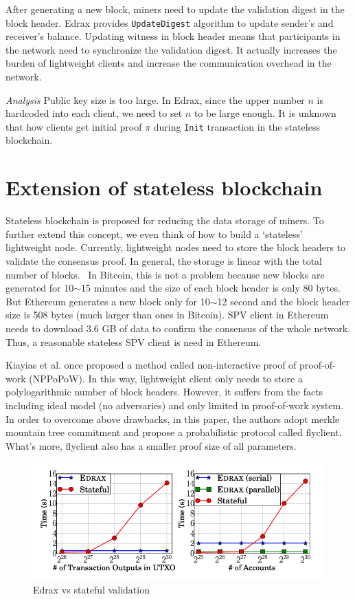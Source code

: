 \documentclass[conference]{IEEEtran}
\begin{document}
After generating a new block, miners need to update the validation digest in the block header.
%
Edrax provides \texttt{UpdateDigest} algorithm to update sender's and receiver's balance.
%
Updating witness in block header means that participants in the network need to synchronize the validation digest.
%
It actually increases the burden of lightweight clients and increase the communication overhead in the network.

\textit{Analysis}
Public key size is too large. 
%
In Edrax, since the upper number $n$ is hardcoded into each client, we need to set $n$ to be large enough.
%
It is unknown that how clients get initial proof $\pi$ during \texttt{Init} transaction in the stateless blockchain.


\section{Extension of stateless blockchain}
Stateless blockchain is proposed for reducing the data storage of miners.
%
To further extend this concept, we even think of how to build a `stateless' lightweight node. 
%
Currently, lightweight nodes need to store the block headers to validate the consensus proof.
%
In general, the storage is linear with the total number of blocks.\
%
In Bitcoin, this is not a problem because new blocks are generated for 10$\sim$15 minutes and the size of each block header is only 80 bytes.
%
But Ethereum generates a new block only for 10$\sim$12 second and the block header size is 508 bytes (much larger than ones in Bitcoin).
%
SPV client in Ethereum needs to download 3.6 GB of data to confirm the consensus of the whole network.
%
Thus, a reasonable stateless SPV client is need in Ethereum. 

Kiayias et al. once proposed a method called non-interactive proof of proof-of-work (NPPoPoW).
%
In this way, lightweight client only needs to store a polylogarithmic number of block headers.
%
However, it suffers from the facts including ideal model (no adversaries) and only limited in proof-of-work system.
%
In order to overcome above drawbacks, in this paper\cite{luuflyclient}, the authors adopt merkle mountain tree commitment and propose a probabilistic protocol called flyclient.
%
What's more, flyclient also has a smaller proof size of all parameters.

\begin{figure}
  \centering
  \includegraphics[width=\linewidth]{figs/evaluation.png}
  \caption{Edrax vs stateful validation}
  \label{Evaluation}
\end{figure}
\end{document}
